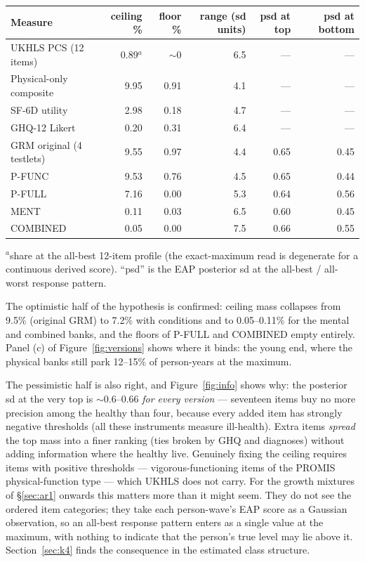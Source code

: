 \documentclass[11pt]{article}
\begin{document}
\begin{center}\small
\begin{tabular}{lrrrrr}
\toprule
Measure & ceiling \% & floor \% & range (sd units) & psd at top & psd at bottom \\
\midrule
UKHLS PCS (12 items) & 0.89$^{a}$ & $\sim$0 & 6.5 & --- & --- \\
Physical-only composite & 9.95 & 0.91 & 4.1 & --- & --- \\
SF-6D utility & 2.98 & 0.18 & 4.7 & --- & --- \\
GHQ-12 Likert & 0.20 & 0.31 & 6.4 & --- & --- \\
GRM original (4 testlets) & 9.55 & 0.97 & 4.4 & 0.65 & 0.45 \\
P-FUNC & 9.53 & 0.76 & 4.5 & 0.65 & 0.44 \\
P-FULL & 7.16 & 0.00 & 5.3 & 0.64 & 0.56 \\
MENT & 0.11 & 0.03 & 6.5 & 0.60 & 0.45 \\
COMBINED & 0.05 & 0.00 & 7.5 & 0.66 & 0.55 \\
\bottomrule
\end{tabular}

{\scriptsize $^{a}$share at the all-best 12-item profile (the exact-maximum
read is degenerate for a continuous derived score). ``psd'' is the EAP
posterior sd at the all-best / all-worst response pattern.}
\end{center}

The optimistic half of the hypothesis is confirmed: ceiling mass collapses
from 9.5\% (original GRM) to 7.2\% with conditions and to 0.05--0.11\% for
the mental and combined banks, and the floors of P-FULL and COMBINED empty
entirely. Panel (c) of Figure~\ref{fig:versions} shows where it binds: the
young end, where the physical banks still park 12--15\% of person-years at
the maximum.

The pessimistic half is also right, and Figure~\ref{fig:info} shows why: the
posterior sd at the very top is $\sim$0.6--0.66 \emph{for every version} ---
seventeen items buy no more precision among the healthy than four, because
every added item has strongly negative thresholds (all these instruments
measure ill-health). Extra items \emph{spread} the top mass into a finer
ranking (ties broken by GHQ and diagnoses) without adding information where
the healthy live. Genuinely fixing the ceiling requires items with positive
thresholds --- vigorous-functioning items of the PROMIS physical-function
type --- which UKHLS does not carry. For the growth mixtures of
\S\ref{sec:ar1} onwards this matters more than it might seem. They do not see
the ordered item categories; they take each person-wave's EAP score as a
Gaussian observation, so an all-best response pattern enters as a single
value at the maximum, with nothing to indicate that the person's true level
may lie above it. Section~\ref{sec:k4} finds the consequence in the estimated
class structure.
\end{document}
